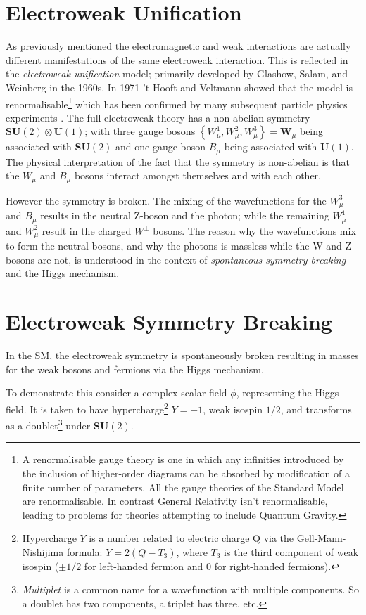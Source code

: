 \section{Electroweak Unification}
\label{ewk uni}
As previously mentioned the electromagnetic and weak interactions are actually different manifestations of the same electroweak interaction. This is reflected in the \emph{electroweak unification} model; primarily developed by Glashow, Salam, and Weinberg in the 1960s. In 1971 't Hooft and Veltmann showed that the model is renormalisable\footnote{A renormalisable gauge theory is one in which any infinities introduced by the inclusion of higher-order diagrams can be absorbed by modification of a finite number of parameters. All the gauge theories of the Standard Model are renormalisable. In contrast General Relativity isn't renormalisable, leading to problems for theories attempting to include Quantum Gravity.} \cite{renorm1,renorm2,renorm3,renorm4} which has been confirmed by many subsequent particle physics experiments \cite{SM_fit}. The full electroweak theory has a non-abelian symmetry $\mathbf{SU}(2) \otimes \mathbf{U}(1)$; with three gauge bosons $ \left\{ W_{\mu}^{1},W_{\mu}^{2},W_{\mu}^{3} \right\} = \mathbf{W}_{\mu}$ being associated with $\mathbf{SU}(2)$ and one gauge boson $B_{\mu}$ being associated with $\mathbf{U}(1)$. The physical interpretation of the fact that the symmetry is non-abelian is that the $W_{\mu}$ and $B_{\mu}$ bosons interact amongst themselves and with each other.

However the symmetry is broken. The mixing of the wavefunctions for the $W_{\mu}^{3}$ and $B_{\mu}$  results in the neutral Z-boson and the photon; while the remaining $W_{\mu}^{1}$ and $W_{\mu}^{2}$ result in the charged $W^{\pm}$ bosons. The reason why the wavefunctions mix to form the neutral bosons, and why the photons is massless while the W and Z bosons are not, is understood in the context of \emph{spontaneous symmetry breaking} and the Higgs mechanism.
\section{Electroweak Symmetry Breaking}
\label{Higgs_section}
In the SM, the electroweak symmetry is spontaneously broken resulting in masses for the weak bosons and fermions via the Higgs mechanism.

To demonstrate this consider a complex scalar field $\phi$, representing the Higgs field. It is taken to have hypercharge\footnote{Hypercharge $Y$ is a number related to electric charge Q via the Gell-Mann-Nishijima formula: $ Y = 2(Q - T_{3})$, where $T_{3}$ is the third component of weak isospin ($ \pm 1/2$ for left-handed fermion and $0$ for right-handed fermions).} $Y = +1$, weak isospin $1/2$, and transforms as a doublet\footnote{\emph{Multiplet} is a common name for a wavefunction with multiple components. So a doublet has two components, a triplet has three, etc.} under $\mathbf{SU}(2)$.

